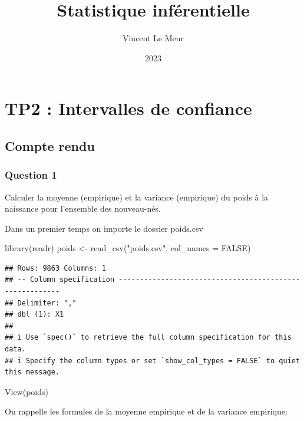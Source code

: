 \documentclass[
]{article}
\title{Statistique inférentielle}
\author{Vincent Le Meur}
\date{2023}
\newenvironment{Shaded}{\begin{snugshade}}{\end{snugshade}}
\newcommand{\AttributeTok}[1]{\textcolor[rgb]{0.77,0.63,0.00}{#1}}
\newcommand{\ConstantTok}[1]{\textcolor[rgb]{0.00,0.00,0.00}{#1}}
\newcommand{\FunctionTok}[1]{\textcolor[rgb]{0.00,0.00,0.00}{#1}}
\newcommand{\NormalTok}[1]{#1}
\newcommand{\OtherTok}[1]{\textcolor[rgb]{0.56,0.35,0.01}{#1}}
\newcommand{\StringTok}[1]{\textcolor[rgb]{0.31,0.60,0.02}{#1}}
\begin{document}
\maketitle

\hypertarget{tp2-intervalles-de-confiance}{%
\section{TP2 : Intervalles de
confiance}\label{tp2-intervalles-de-confiance}}

\hypertarget{compte-rendu}{%
\subsection{Compte rendu}\label{compte-rendu}}

\hypertarget{question-1}{%
\subsubsection{Question 1}\label{question-1}}

Calculer la moyenne (empirique) et la variance (empirique) du poids à la
naissance pour l'ensemble des nouveau-nés.

Dans un premier temps on importe le dossier poids.csv

\begin{Shaded}
\begin{Highlighting}[]
\FunctionTok{library}\NormalTok{(readr)}
\NormalTok{poids }\OtherTok{\textless{}{-}} \FunctionTok{read\_csv}\NormalTok{(}\StringTok{"poids.csv"}\NormalTok{, }\AttributeTok{col\_names =} \ConstantTok{FALSE}\NormalTok{)}
\end{Highlighting}
\end{Shaded}

\begin{verbatim}
## Rows: 9863 Columns: 1
## -- Column specification --------------------------------------------------------
## Delimiter: ","
## dbl (1): X1
## 
## i Use `spec()` to retrieve the full column specification for this data.
## i Specify the column types or set `show_col_types = FALSE` to quiet this message.
\end{verbatim}

\begin{Shaded}
\begin{Highlighting}[]
\FunctionTok{View}\NormalTok{(poids)}
\end{Highlighting}
\end{Shaded}

On rappelle les formules de la moyenne empirique et de la variance
empirique:
\end{document}
